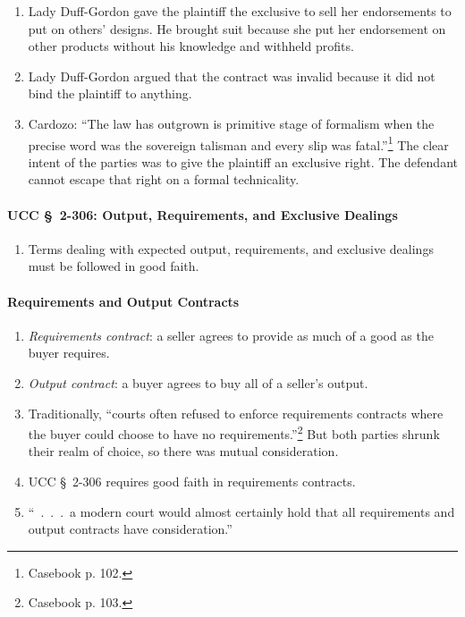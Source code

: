\begin{enumerate}
    \item Lady Duff-Gordon gave the plaintiff the exclusive to sell her 
    endorsements to put on others' designs. He brought suit because she put 
    her endorsement on other products without his knowledge and withheld 
    profits.
    \item Lady Duff-Gordon argued that the contract was invalid because it did 
    not bind the plaintiff to anything.
    \item Cardozo: ``The law has outgrown is primitive stage of formalism when 
    the precise word was the sovereign talisman and every slip was 
    fatal.''\footnote{Casebook p. 102.} The clear intent of the parties was to 
    give the plaintiff an exclusive right. The defendant cannot escape that 
    right on a formal technicality.
\end{enumerate}

\paragraph{UCC \S\ 2-306: Output, Requirements, and Exclusive Dealings}

\begin{enumerate}
    \item Terms dealing with expected output, requirements, and exclusive 
    dealings must be followed in good faith.
\end{enumerate}

\paragraph{Requirements and Output Contracts}

\begin{enumerate}
    \item \emph{Requirements contract}: a seller agrees to provide as much of 
    a good as the buyer requires.
    \item \emph{Output contract}: a buyer agrees to buy all of a seller's 
    output.
    \item Traditionally, ``courts often refused to enforce requirements 
    contracts where the buyer could choose to have no 
    requirements.''\footnote{Casebook p. 103.} But both parties shrunk their 
    realm of choice, so there was mutual consideration.
    \item UCC \S\ 2-306 requires good faith in requirements contracts.
    \item ``~.~.~.~a modern court would almost certainly hold that all 
    requirements and output contracts have consideration.''
\end{enumerate}

